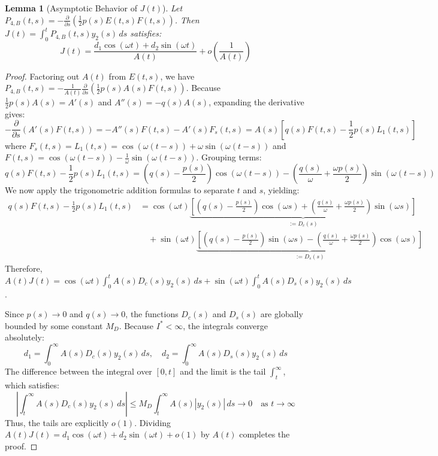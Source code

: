 \documentclass[10pt,reqno]{amsart}
\newtheorem{lemma}[theorem]{Lemma}
\theoremstyle{definition}
\begin{document}
	\begin{lemma}[Asymptotic Behavior of $J(t)$]
		Let $P_{4,B}(t,s) = - \frac{\partial}{\partial s} \left( \frac{1}{2}p(s) E(t, s) F(t, s) \right)$. Then $J(t) = \int_0^t P_{4,B}(t,s)y_2(s)\,ds$ satisfies:
		\[ J(t) = \frac{d_1 \cos(\omega t) + d_2 \sin(\omega t)}{A(t)} + o\left(\frac{1}{A(t)}\right) \]
	\end{lemma}
	
	\begin{proof}
		Factoring out $A(t)$ from $E(t,s)$, we have $P_{4,B}(t,s) = -\frac{1}{A(t)} \frac{\partial}{\partial s} \left( \frac{1}{2}p(s)A(s)F(t,s) \right)$. Because $\frac{1}{2}p(s)A(s) = A'(s)$ and $A''(s) = -q(s)A(s)$, expanding the derivative gives:
		\[ -\frac{\partial}{\partial s} (A'(s)F(t,s)) = -A''(s)F(t,s) - A'(s)F_s(t,s) = A(s) \left[ q(s)F(t,s) - \frac{1}{2}p(s)L_1(t,s) \right] \]
		where $F_s(t,s) = L_1(t,s) = \cos(\omega(t-s)) + \omega\sin(\omega(t-s))$ and $F(t,s) = \cos(\omega(t-s)) - \frac{1}{\omega}\sin(\omega(t-s))$. Grouping terms:
		\[ q(s)F(t,s) - \frac{1}{2}p(s)L_1(t,s) = \left( q(s) - \frac{p(s)}{2} \right)\cos(\omega(t-s)) - \left( \frac{q(s)}{\omega} + \frac{\omega p(s)}{2} \right)\sin(\omega(t-s)) \]
		We now apply the trigonometric addition formulas to separate $t$ and $s$, yielding:
		\begin{align*}
			q(s)F(t,s) - \frac{1}{2}p(s)L_1(t,s) &= \cos(\omega t) \underbrace{\left[ \left( q(s) - \frac{p(s)}{2} \right)\cos(\omega s) + \left( \frac{q(s)}{\omega} + \frac{\omega p(s)}{2} \right)\sin(\omega s) \right]}_{:= D_c(s)} \\
			&\quad + \sin(\omega t) \underbrace{\left[ \left( q(s) - \frac{p(s)}{2} \right)\sin(\omega s) - \left( \frac{q(s)}{\omega} + \frac{\omega p(s)}{2} \right)\cos(\omega s) \right]}_{:= D_s(s)}
		\end{align*}
		Therefore, $A(t)J(t) = \cos(\omega t) \int_0^t A(s)D_c(s)y_2(s)\,ds + \sin(\omega t) \int_0^t A(s)D_s(s)y_2(s)\,ds$.
		
		Since $p(s) \to 0$ and $q(s) \to 0$, the functions $D_c(s)$ and $D_s(s)$ are globally bounded by some constant $M_D$. Because $I^* < \infty$, the integrals converge absolutely:
		\[ d_1 = \int_0^\infty A(s)D_c(s)y_2(s)\,ds, \quad d_2 = \int_0^\infty A(s)D_s(s)y_2(s)\,ds \]
		The difference between the integral over $[0, t]$ and the limit is the tail $\int_t^\infty$, which satisfies:
		\[ \left| \int_t^\infty A(s)D_c(s)y_2(s)\,ds \right| \leq M_D \int_t^\infty A(s)|y_2(s)|\,ds \to 0 \quad \text{as } t \to \infty \]
		Thus, the tails are explicitly $o(1)$. Dividing $A(t)J(t) = d_1 \cos(\omega t) + d_2 \sin(\omega t) + o(1)$ by $A(t)$ completes the proof.
	\end{proof}
	
\end{document}
